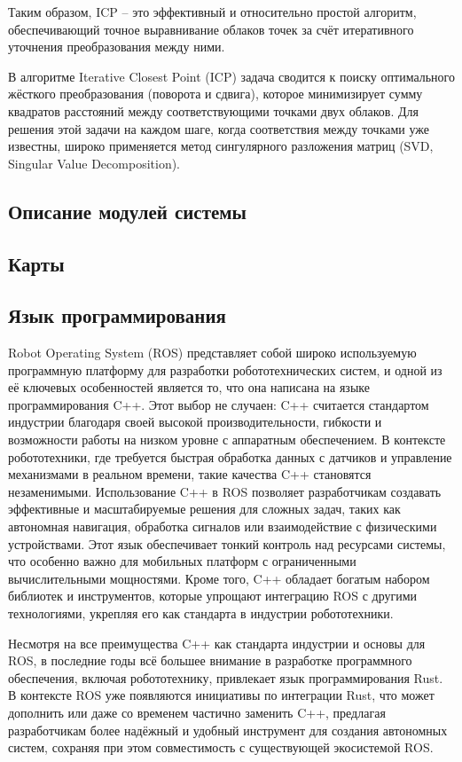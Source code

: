 Таким образом, ICP -- это эффективный и относительно простой алгоритм, обеспечивающий точное выравнивание облаков точек за счёт итеративного уточнения преобразования между ними.

В алгоритме Iterative Closest Point (ICP) задача сводится к поиску оптимального жёсткого преобразования (поворота и сдвига), которое минимизирует сумму квадратов расстояний между соответствующими точками двух облаков. Для решения этой задачи на каждом шаге, когда соответствия между точками уже известны, широко применяется метод сингулярного разложения матриц (SVD, Singular Value Decomposition).


\subsection{Описание модулей системы}

\subsection{Карты}


\subsection{Язык программирования}
Robot Operating System (ROS) представляет собой широко используемую программную
платформу для разработки робототехнических систем, и одной из её ключевых
особенностей является то, что она написана на языке программирования C++. Этот
выбор не случаен: C++ считается стандартом индустрии благодаря своей высокой
производительности, гибкости и возможности работы на низком уровне с аппаратным
обеспечением. В контексте робототехники, где требуется быстрая обработка данных
с датчиков и управление механизмами в реальном времени, такие качества C++
становятся незаменимыми. Использование C++ в ROS позволяет разработчикам
создавать эффективные и масштабируемые решения для сложных задач, таких как
автономная навигация, обработка сигналов или взаимодействие с физическими
устройствами. Этот язык обеспечивает тонкий контроль над ресурсами системы, что
особенно важно для мобильных платформ с ограниченными вычислительными
мощностями. Кроме того, C++ обладает богатым набором библиотек и инструментов,
которые упрощают интеграцию ROS с другими технологиями, укрепляя его как
стандарта в индустрии робототехники.

Несмотря на все преимущества C++ как стандарта индустрии и основы для ROS, в
последние годы всё большее внимание в разработке программного обеспечения,
включая робототехнику, привлекает язык программирования Rust. В контексте ROS
уже появляются инициативы по интеграции Rust, что может дополнить или даже со
временем частично заменить C++, предлагая разработчикам более надёжный и удобный
инструмент для создания автономных систем, сохраняя при этом совместимость с
существующей экосистемой ROS.

